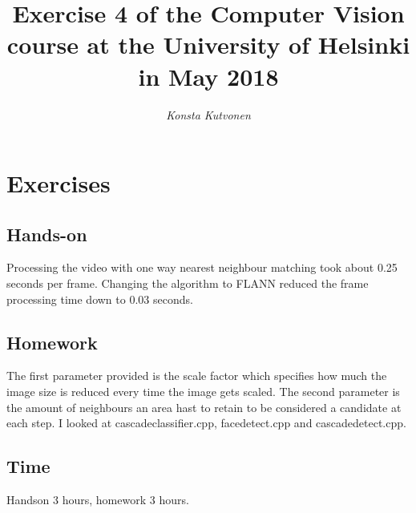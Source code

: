 \documentclass{article}
\begin{document}
\title{Exercise 4 of the Computer Vision course at the
  University of Helsinki in May 2018}

\author{\emph{Konsta Kutvonen}}
\maketitle



\newpage
\section{Exercises}
\subsection{Hands-on}
Processing the video with one way nearest neighbour matching took about 0.25 seconds per frame. Changing the algorithm to FLANN reduced the frame processing time down to 0.03 seconds.

\subsection{Homework}
The first parameter provided is the scale factor which specifies how much the image size is reduced every time the image gets scaled. The second parameter is the amount of neighbours an area hast to retain to be considered a candidate at each step.
I looked at cascadeclassifier.cpp, facedetect.cpp and cascadedetect.cpp. 
\subsection{Time}
Handson 3 hours, homework 3 hours.
\end{document}

